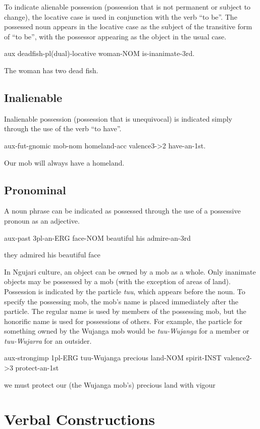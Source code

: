 To indicate alienable possession (possession that is not permanent or subject to
change), the locative case is used in conjunction with the verb ``to be''. The
possessed noun appears in the locative case as the subject of the transitive
form of ``to be'', with the possessor appearing as the object in the usual case.

aux deadfish-pl(dual)-locative woman-NOM is-inanimate-3rd.

The woman has two dead fish.

\subsection{Inalienable}

Inalienable possession (possession that is unequivocal) is indicated simply
through the use of the verb ``to have''.

aux-fut-gnomic mob-nom homeland-acc valence3->2 have-an-1st.

Our mob will always have a homeland.

\subsection{Pronominal}

A noun phrase can be indicated as possessed through the use of a possessive
pronoun as an adjective.

aux-past 3pl-an-ERG face-NOM beautiful his admire-an-3rd

they admired his beautiful face

In Ngujari culture, an object can be owned by a mob as a whole. Only inanimate
objects may be possessed by a mob (with the exception of areas of land).
Possession is indicated by the particle \textit{tuu}, which appears before the noun. To
specify the possessing mob, the mob's name is placed immediately after the
particle. The regular name is used by members of the possessing mob, but the
honorific name is used for possessions of others. For example, the particle for
something owned by the Wujanga mob would be \textit{tuu-Wujanga} for a member or
\textit{tuu-Wujarra} for an outsider.

aux-strongimp 1pl-ERG tuu-Wujanga precious land-NOM spirit-INST valence2->3
protect-an-1st

we must protect our (the Wujanga mob's) precious land with vigour

\section{Verbal Constructions}

